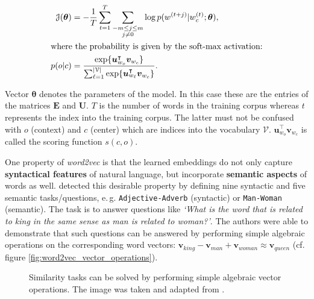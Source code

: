 \vspace*{-6mm}
\begin{align}
	\mathcal{J}(\bm{\theta})
		&= -\frac{1}{T} \sum_{t=1}^T \sum_{\substack{-m \le j \le m \\ j \ne 0}}
			\log p(w^{(t+j)} \vert w_c^{(t)}; \bm{\theta}), \\
	\intertext{where the probability is given by the soft-max activation:}
	p(o \vert c)
		&= \frac{\exp\{ \bm{u}_{w_o}^{\intercal} \bm{v}_{w_c}\}}{
			\sum_{\ell=1}^{\vert \mathcal{V} \vert} \exp\{ \bm{u}_{w_\ell}^{\intercal} \bm{v}_{w_c}\}}.
\end{align}
\vspace*{-2mm}

Vector $\bm{\theta}$ denotes the parameters of the model. In this case these are the entries of the matrices $\bm{E}$ and $\bm{U}$. $T$ is the number of words in the training corpus whereas $t$ represents the index into the training corpus. The latter must not be confused with $o$ (context) and $c$ (center) which are indices into the vocabulary $\mathcal{V}$. $\bm{u}_{w_o}^{\intercal} \bm{v}_{w_c}$ is called the scoring function $s(c, o)$.

One property of \textit{word2vec} is that the learned embeddings do not only capture \textbf{syntactical features} of natural language, but incorporate \textbf{semantic aspects} of words as well. \citep{Mikolov.2013c} detected this desirable property by defining nine syntactic and five semantic tasks/questions, e.\,g. \texttt{Adjective-Adverb} (syntactic) or \texttt{Man-Woman} (semantic). The task is to answer questions like \textit{`What is the word that is related to king in the same sense as man is related to woman?'}. The authors were able to demonstrate that such questions can be answered by performing simple algebraic operations on the corresponding word vectors: $\bm{v}_{king} - \bm{v}_{man} + \bm{v}_{woman} \approx \bm{v}_{queen}$ (cf. figure \vref{fig:word2vec_vector_operations}).

\begin{figure}[h]
  	\centering
    	
  	\caption[Evaluation of word embeddings using similarity tasks]
  	{Similarity tasks can be solved by performing simple algebraic vector operations. The image was taken and adapted from
	\citep{Mikolov.2013c}.}
	\label{fig:word2vec_vector_operations}
\end{figure}


